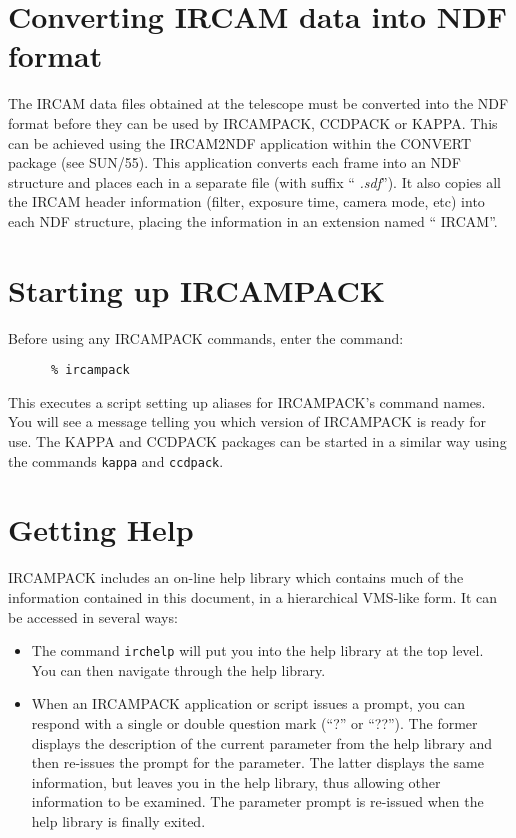 \section{Converting IRCAM data into NDF format}

The {\small IRCAM} data files obtained at the telescope must be
converted into the {\small NDF} format before they can be used by
{\small IRCAMPACK, CCDPACK} or {\small KAPPA}. This can be achieved
using the {\small IRCAM2NDF} application within the {\small CONVERT}
package (see SUN/55). This application converts each frame into an NDF
structure and places each in a separate file (with suffix ``{\em
.sdf}''). It also copies all the {\small IRCAM} header information
(filter, exposure time, camera mode, etc) into each {\small NDF}
structure, placing the information in an extension named ``{\small
IRCAM}''.

\section{Starting up IRCAMPACK}

Before using any {\small IRCAMPACK} commands, enter the command:

\small
\begin{verbatim}
      % ircampack
\end{verbatim}
\normalsize

This executes a script setting up aliases for {\small IRCAMPACK}'s
command names. You will see a message telling you which version of
{\small IRCAMPACK} is ready for use. The {\small KAPPA} and {\small
CCDPACK} packages can be started in a similar way using the commands
\verb+kappa+ and \verb+ccdpack+.

\section{Getting Help}

{\small IRCAMPACK} includes an on-line help library which contains much
of the information contained in this document, in a hierarchical
VMS-like form. It can be accessed in several ways:

\begin {itemize}

\item The command \verb+irchelp+ will put you into the help library at
the top level. You can then navigate through the help library.

\item When an {\small IRCAMPACK} application or script issues a prompt,
you can respond with a single or double question mark (``?'' or
``??''). The former displays the description of the current parameter
from the help library and then re-issues the prompt for the parameter.
The latter displays the same information, but leaves you in the help
library, thus allowing other information to be examined. The parameter
prompt is re-issued when the help library is finally exited.

\end{itemize}


